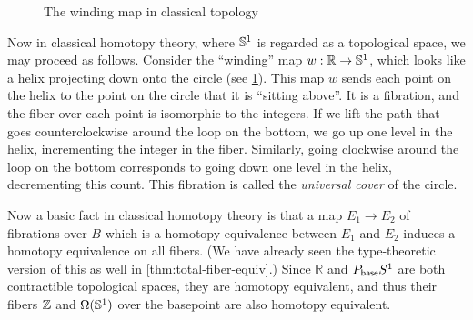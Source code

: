 \begin{figure}\centering
  \caption{The winding map in classical topology}\label{fig:winding}
\end{figure}

Now in classical homotopy theory, where $\mathbb{S}^1$ is regarded as a topological space, we may proceed as follows.
%
Consider the ``winding'' map $w:\mathbb{R}\to \mathbb{S} ^1$, which looks like a helix projecting down onto the circle (see \cref{fig:winding}).
This map $w$ sends each point on the helix to the point on the circle that it is ``sitting above''.
It is a fibration, and the fiber over each point is isomorphic to the integers.
If we lift the path that goes counterclockwise around the loop on the bottom, we go up one level in the helix, incrementing the integer in the fiber.
Similarly, going clockwise around the loop on the bottom corresponds to going down one level in the helix, decrementing this count.
This fibration is called the \emph{universal cover} of the circle.
%
%
%

Now a basic fact in classical homotopy theory is that a map $E_1\to E_2$ of fibrations over $B$ which is a homotopy equivalence between $E_1$ and $E_2$ induces a homotopy equivalence on all fibers.
(We have already seen the type-theoretic version of this as well in \cref{thm:total-fiber-equiv}.)
Since $\mathbb{R}$ and $P_{\mathsf{base}} S^1$ are both contractible topological spaces, they are homotopy equivalent, and thus their fibers $\mathbb{Z}$ and $\Omega(\mathbb{S} ^1)$ over the basepoint are also homotopy equivalent.

